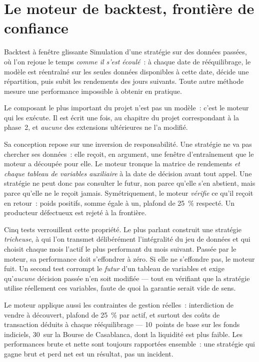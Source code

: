 \section{Le moteur de backtest, frontière de confiance}

\begin{definitionbox}{Backtest à fenêtre glissante}
Simulation d'une stratégie sur des données passées, où l'on rejoue le temps
\emph{comme il s'est écoulé}~: à chaque date de rééquilibrage, le modèle est
réentraîné sur les seules données disponibles à cette date, décide une
répartition, puis subit les rendements des jours suivants. Toute autre méthode
mesure une performance impossible à obtenir en pratique.
\end{definitionbox}

Le composant le plus important du projet n'est pas un modèle~: c'est le moteur
qui les exécute. Il est écrit une fois, au chapitre du projet correspondant à la
phase~2, et \emph{aucune} des extensions ultérieures ne l'a modifié.

Sa conception repose sur une inversion de responsabilité. Une stratégie ne va pas
chercher ses données~: elle reçoit, en argument, une fenêtre d'entraînement que le
moteur a découpée pour elle. Le moteur tronque la matrice de rendements
\emph{et chaque tableau de variables auxiliaire} à la date de décision avant tout
appel. Une stratégie ne peut donc pas consulter le futur, non parce qu'elle
s'en abstient, mais parce qu'elle ne le reçoit jamais. Symétriquement, le moteur
\emph{vérifie} ce qu'il reçoit en retour~: poids positifs, somme égale à un,
plafond de 25~\% respecté. Un producteur défectueux est rejeté à la frontière.

Cinq tests verrouillent cette propriété. Le plus parlant construit une stratégie
\emph{tricheuse}, à qui l'on transmet délibérément l'intégralité du jeu de données
et qui choisit chaque mois l'actif le plus performant du mois suivant. Passée par
le moteur, sa performance doit s'effondrer à zéro. Si elle ne s'effondre pas, le
moteur fuit. Un second test corrompt le \emph{futur} d'un tableau de variables et
exige qu'\emph{aucune} décision passée n'en soit modifiée — tout en vérifiant que
la stratégie utilise réellement ces variables, faute de quoi la garantie serait
vide de sens.

\begin{remarquebox}
Le moteur applique aussi les contraintes de gestion réelles~: interdiction de
vendre à découvert, plafond de 25~\% par actif, et surtout des coûts de
transaction déduits à chaque rééquilibrage — 10~points de base sur les fonds
indiciels, 30~sur la Bourse de Casablanca, dont la liquidité est plus faible. Les
performances brute et nette sont toujours rapportées ensemble~: une stratégie qui
gagne brut et perd net est un résultat, pas un incident.
\end{remarquebox}

